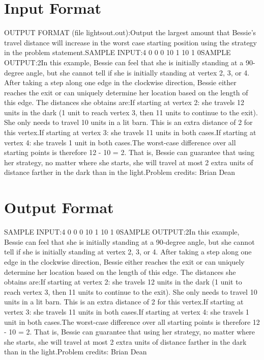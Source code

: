 \documentclass[12pt]{article}
\begin{document}
\section*{Input Format}
OUTPUT FORMAT (file lightsout.out):Output the largest amount that Bessie's travel distance will increase in the
worst case starting position using the strategy in the problem statement.SAMPLE INPUT:4
0 0
0 10
1 10
1 0SAMPLE OUTPUT:2In this example, Bessie can feel that she is initially standing at a 90-degree
angle, but she cannot tell if she is initially standing at vertex 2, 3, or 4.
After taking a step along one edge in the clockwise direction, Bessie either
reaches the exit or can uniquely determine her location based on the length of
this edge.  The distances she obtains are:If starting at vertex 2: she travels 12 units in the dark (1 unit to reach
vertex 3, then 11 units to continue to the exit).  She only needs to travel 10
units in a lit barn.  This is an extra distance of 2 for this vertex.If starting at vertex 3: she travels 11 units in both cases.If starting at vertex 4: she travels 1 unit in both cases.The worst-case difference over all starting points is therefore 12 - 10 = 2.  That
is, Bessie can guarantee that using her strategy, no matter where she starts,
she will travel at most 2 extra units of distance farther in the dark than in the light.Problem credits: Brian Dean

\section*{Output Format}
SAMPLE INPUT:4
0 0
0 10
1 10
1 0SAMPLE OUTPUT:2In this example, Bessie can feel that she is initially standing at a 90-degree
angle, but she cannot tell if she is initially standing at vertex 2, 3, or 4.
After taking a step along one edge in the clockwise direction, Bessie either
reaches the exit or can uniquely determine her location based on the length of
this edge.  The distances she obtains are:If starting at vertex 2: she travels 12 units in the dark (1 unit to reach
vertex 3, then 11 units to continue to the exit).  She only needs to travel 10
units in a lit barn.  This is an extra distance of 2 for this vertex.If starting at vertex 3: she travels 11 units in both cases.If starting at vertex 4: she travels 1 unit in both cases.The worst-case difference over all starting points is therefore 12 - 10 = 2.  That
is, Bessie can guarantee that using her strategy, no matter where she starts,
she will travel at most 2 extra units of distance farther in the dark than in the light.Problem credits: Brian Dean
\end{document}
